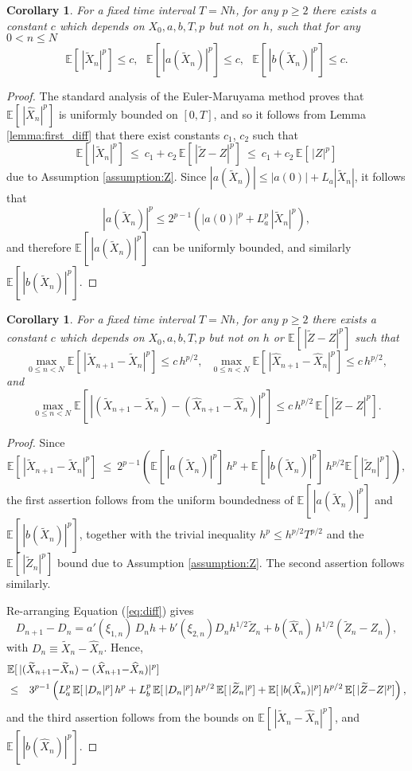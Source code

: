 \documentclass[11pt]{article}
\def \EE {{\mathbb{E}}}
\def \tZ {{\widetilde{Z}}}
\def \tXn {{\widetilde{X}_n}}
\def \tXnp {{\widetilde{X}_{n+1}}}
\def \hXn {{\widehat{X}_n}}
\def \hXnp {{\widehat{X}_{n+1}}}
\newtheorem{corollary}[theorem]{Corollary}
\begin{document}
\begin{corollary}
\label{corollary:bounds}
For a fixed time interval $T\!=\!N h$, for any $p\!\geq\!2$ there exists a 
constant $c$ which depends on $X_0, a, b, T, p$ but not on $h$, 
such that for any $0\!<\!n\!\leq\!N$
\[
\EE[\, |\tXn|^p] \leq c, ~~~
\EE[\, |a(\tXn)|^p] \leq c, ~~~
\EE[\, |b(\tXn)|^p] \leq c.
\]
\end{corollary}
\begin{proof}
The standard analysis of the Euler-Maruyama method proves that $\EE[\, |\hXn|^p]$
is uniformly bounded on $[0,T]$, and so it follows from Lemma \ref{lemma:first_diff} 
that there exist constants $c_1$, $c_2$ such that
\[
\EE[\, |\tXn|^p] 
\ \leq\ c_1 + c_2\, \EE[\, |\tZ{-}Z|^p]
\ \leq\ c_1 + c_2\, \EE[\, |Z|^p ]
\]
due to Assumption \ref{assumption:Z}.
Since $|a(\tXn)| \leq |a(0)| + L_a |\tXn|$, it follows that
\[
|a(\tXn)|^p \leq 2^{p-1} \left( |a(0)|^p + L^p_a\, |\tXn|^p \right),
\]
and therefore $\EE[\, |a(\tXn)|^p]$ can be uniformly bounded, and similarly
$\EE[\, |b(\tXn)|^p]$.
\end{proof}

\begin{corollary}
\label{corollary:delta_t}
For a fixed time interval $T\!=\!N h$, for any $p\!\geq\!2$ there exists a 
constant $c$ which depends on $X_0, a, b, T, p$ but not on $h$ or 
$\EE[\, |\tZ{-}Z|^p]$ such that
\[
\max_{0\leq n < N} \EE[\, |\tXnp{-}\tXn|^p] \leq c\, h^{p/2}, ~~~
\max_{0\leq n < N} \EE[\, |\hXnp{-}\hXn|^p] \leq c\, h^{p/2},
\]
and
\[
\max_{0\leq n < N} \EE\left[\, |(\tXnp{-}\tXn)-(\hXnp{-}\hXn)|^p\right] 
\leq c\, h^{p/2}\, \EE[\, |\tZ{-}Z|^p].
\]
\end{corollary}
\begin{proof}
Since
\[
\EE[\, |\tXnp{-}\tXn|^p]
\ \leq\ 2^{p-1} \left( \EE[\,|a(\tXn)|^p] \, h^p + \EE[\,|b(\tXn)|^p]\, h^{p/2} \EE[\,|\tZ_n|^p] \right),
\]
the first assertion follows from the uniform boundedness of $\EE[\,|a(\tXn)|^p]$ and $\EE[\,|b(\tXn)|^p]$,
together with the trivial inequality $h^p\!\leq\! h^{p/2}T^{p/2}$ and the $\EE[\,|\tZ_n|^p]$ bound due
to Assumption \ref{assumption:Z}. The second assertion follows similarly.

Re-arranging Equation (\ref{eq:diff}) gives
\[
D_{n+1}-D_n = a'(\xi_{1,n})\, D_n h + b'(\xi_{2,n}) D_n h^{1/2} \tZ_n
                                 + b(\hXn) \, h^{1/2} (\tZ_n{-}Z_n),
\]
with $D_n \equiv \tXn{-}\hXn$. Hence,
\begin{eqnarray*}
  \lefteqn{  \EE[\, |(\tXnp{-}\tXn)-(\hXnp{-}\hXn)|^p]}
\\ &\leq& 3^{p-1}\left(
    L_a^p\, \EE[\, |D_n|^p]\, h^p
    + L_b^p\, \EE[\, |D_n|^p]\, h^{p/2}\, \EE[\,|\tZ_n|^p]
    + \EE[\, |b(\hXn)|^p]\, h^{p/2}\, \EE[\,|\tZ{-}Z|^p] \right),
\end{eqnarray*}
and the third assertion follows from the bounds on $\EE[\, |\tXn{-}\hXn|^p]$,
and $\EE[\, |b(\hXn)|^p]$.
\end{proof}
\end{document}
